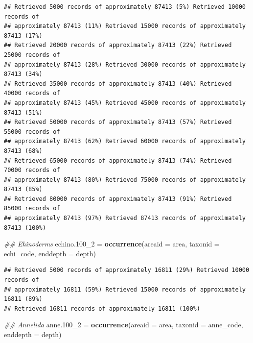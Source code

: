 \documentclass[12pt,]{article}
\newenvironment{Shaded}{\begin{snugshade}}{\end{snugshade}}
\newcommand{\CommentTok}[1]{\textcolor[rgb]{0.56,0.35,0.01}{\textit{#1}}}
\newcommand{\DataTypeTok}[1]{\textcolor[rgb]{0.13,0.29,0.53}{#1}}
\newcommand{\DecValTok}[1]{\textcolor[rgb]{0.00,0.00,0.81}{#1}}
\newcommand{\FloatTok}[1]{\textcolor[rgb]{0.00,0.00,0.81}{#1}}
\newcommand{\KeywordTok}[1]{\textcolor[rgb]{0.13,0.29,0.53}{\textbf{#1}}}
\newcommand{\NormalTok}[1]{#1}
\newcommand{\StringTok}[1]{\textcolor[rgb]{0.31,0.60,0.02}{#1}}
\begin{document}
\begin{verbatim}
## Retrieved 5000 records of approximately 87413 (5%) Retrieved 10000 records of
## approximately 87413 (11%) Retrieved 15000 records of approximately 87413 (17%)
## Retrieved 20000 records of approximately 87413 (22%) Retrieved 25000 records of
## approximately 87413 (28%) Retrieved 30000 records of approximately 87413 (34%)
## Retrieved 35000 records of approximately 87413 (40%) Retrieved 40000 records of
## approximately 87413 (45%) Retrieved 45000 records of approximately 87413 (51%)
## Retrieved 50000 records of approximately 87413 (57%) Retrieved 55000 records of
## approximately 87413 (62%) Retrieved 60000 records of approximately 87413 (68%)
## Retrieved 65000 records of approximately 87413 (74%) Retrieved 70000 records of
## approximately 87413 (80%) Retrieved 75000 records of approximately 87413 (85%)
## Retrieved 80000 records of approximately 87413 (91%) Retrieved 85000 records of
## approximately 87413 (97%) Retrieved 87413 records of approximately 87413 (100%)
\end{verbatim}

\begin{Shaded}
\begin{Highlighting}[]
\CommentTok{## Ehinoderms}
\NormalTok{echino}\FloatTok{.100}\NormalTok{_}\DecValTok{2}\NormalTok{ =}\StringTok{ }\KeywordTok{occurrence}\NormalTok{(}\DataTypeTok{areaid =}\NormalTok{ area, }\DataTypeTok{taxonid =}\NormalTok{ echi_code, }\DataTypeTok{enddepth =}\NormalTok{ depth)}
\end{Highlighting}
\end{Shaded}

\begin{verbatim}
## Retrieved 5000 records of approximately 16811 (29%) Retrieved 10000 records of
## approximately 16811 (59%) Retrieved 15000 records of approximately 16811 (89%)
## Retrieved 16811 records of approximately 16811 (100%)
\end{verbatim}

\begin{Shaded}
\begin{Highlighting}[]
\CommentTok{## Annelida}
\NormalTok{anne}\FloatTok{.100}\NormalTok{_}\DecValTok{2}\NormalTok{ =}\StringTok{ }\KeywordTok{occurrence}\NormalTok{(}\DataTypeTok{areaid =}\NormalTok{ area, }\DataTypeTok{taxonid =}\NormalTok{ anne_code, }\DataTypeTok{enddepth =}\NormalTok{ depth)}
\end{Highlighting}
\end{Shaded}
\end{document}

